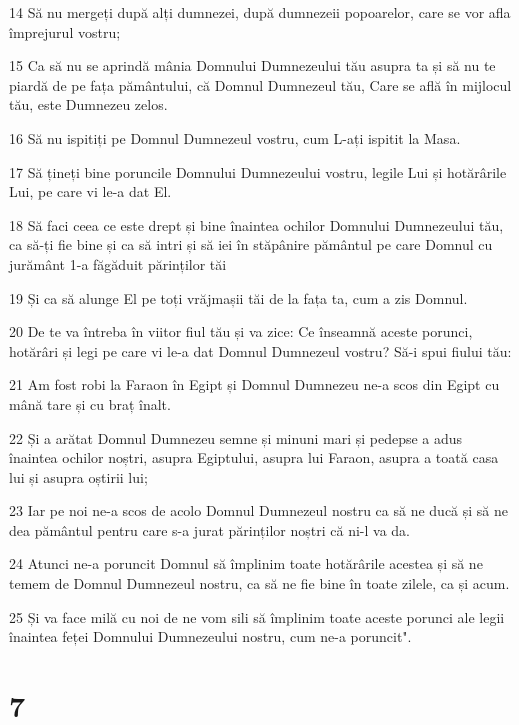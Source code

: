 \par 14 Să nu mergeți după alți dumnezei, după dumnezeii popoarelor, care se vor afla împrejurul vostru;
\par 15 Ca să nu se aprindă mânia Domnului Dumnezeului tău asupra ta și să nu te piardă de pe fața pământului, că Domnul Dumnezeul tău, Care se află în mijlocul tău, este Dumnezeu zelos.
\par 16 Să nu ispitiți pe Domnul Dumnezeul vostru, cum L-ați ispitit la Masa.
\par 17 Să țineți bine poruncile Domnului Dumnezeului vostru, legile Lui și hotărârile Lui, pe care vi le-a dat El.
\par 18 Să faci ceea ce este drept și bine înaintea ochilor Domnului Dumnezeului tău, ca să-ți fie bine și ca să intri și să iei în stăpânire pământul pe care Domnul cu jurământ 1-a făgăduit părinților tăi
\par 19 Și ca să alunge El pe toți vrăjmașii tăi de la fața ta, cum a zis Domnul.
\par 20 De te va întreba în viitor fiul tău și va zice: Ce înseamnă aceste porunci, hotărâri și legi pe care vi le-a dat Domnul Dumnezeul vostru? Să-i spui fiului tău:
\par 21 Am fost robi la Faraon în Egipt și Domnul Dumnezeu ne-a scos din Egipt cu mână tare și cu braț înalt.
\par 22 Și a arătat Domnul Dumnezeu semne și minuni mari și pedepse a adus înaintea ochilor noștri, asupra Egiptului, asupra lui Faraon, asupra a toată casa lui și asupra oștirii lui;
\par 23 Iar pe noi ne-a scos de acolo Domnul Dumnezeul nostru ca să ne ducă și să ne dea pământul pentru care s-a jurat părinților noștri că ni-l va da.
\par 24 Atunci ne-a poruncit Domnul să împlinim toate hotărârile acestea și să ne temem de Domnul Dumnezeul nostru, ca să ne fie bine în toate zilele, ca și acum.
\par 25 Și va face milă cu noi de ne vom sili să împlinim toate aceste porunci ale legii înaintea feței Domnului Dumnezeului nostru, cum ne-a poruncit".

\chapter{7}

